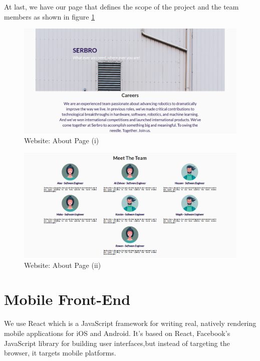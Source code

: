 At last, we have our page that defines the scope of the project and the team members as shown in figure \ref{fig: about1}
  \begin{figure}[htp]%
    \center%
    \includegraphics[width=1\textwidth]{images/Software/about1.PNG}%
    \caption[Website: About Page (i)]{Website:  About Page (i)}\label{fig: about1}%
  \end{figure}
   \begin{figure}[htp]%
    \center%
    \includegraphics[width=1\textwidth]{images/Software/about2.PNG}%
    \caption[Website: About Page (ii)]{Website:  About Page (ii)}\label{fig: about2}%
  \end{figure}
\section{Mobile Front-End}
\hspace{2cm}We use React  which is a JavaScript framework for writing real, natively rendering mobile applications for iOS and Android. It’s based on React, Facebook’s JavaScript library for building user interfaces,but instead of targeting the browser, it targets mobile platforms.

